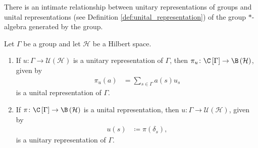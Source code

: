 There is an intimate relationship between unitary representations of groups and unital representations (see Definition \ref{def:unital_representation}) of the group $\ast$-algebra generated by the group.
\begin{proposition}\label{prop:unital_unitary_representation}
  Let $\Gamma$ be a group and let $\mathcal{H}$ be a Hilbert space.
  \begin{enumerate}[(1)]
    \item If $u\colon \Gamma\rightarrow \mathcal{U}\left( \mathcal{H} \right)$ is a unitary representation of $\Gamma$, then $\pi_u\colon \C\left[ \Gamma \right]\rightarrow \B\left( \mathcal{H} \right)$, given by
      \begin{align*}
        \pi_u(a) &= \sum_{s\in\Gamma}a(s)u_s
      \end{align*}
      is a unital representation of $\Gamma$.
    \item If $\pi\colon \C\left[ \Gamma \right]\rightarrow \B\left( \mathcal{H} \right)$ is a unital representation, then $u\colon \Gamma\rightarrow \mathcal{U}\left( \mathcal{H} \right)$, given by
      \begin{align*}
        u(s) &\coloneq \pi\left( \delta_s \right),
      \end{align*}
      is a unitary representation of $\Gamma$.
  \end{enumerate}
\end{proposition}
